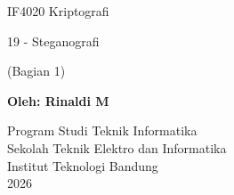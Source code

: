 \documentclass{article}
\begin{document}

\begin{center}
IF4020 Kriptografi

{\huge \color{red} 19 - Steganografi}

{\large \color{red} (Bagian 1)}

\vspace{30mm}

\textbf{Oleh: Rinaldi M}

Program Studi Teknik Informatika\\
Sekolah Teknik Elektro dan Informatika\\
Institut Teknologi Bandung\\
2026
\end{center}
\end{document}

